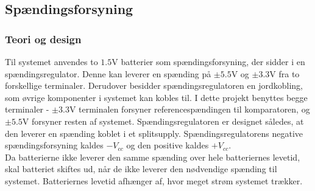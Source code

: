 \subsection{Spændingsforsyning}
\subsubsection{Teori og design}
Til systemet anvendes to $1.5$V batterier som spændingsforsyning, der sidder i en spændingsregulator. Denne kan leverer en spænding på $\pm5.5$V og $\pm3.3$V fra to forskellige terminaler. Derudover besidder spændingsregulatoren en jordkobling, som øvrige komponenter i systemet kan kobles til. I dette projekt benyttes begge terminaler - $\pm3.3$V terminalen forsyner referencespændingen til komparatoren, og $\pm5.5$V forsyner resten af systemet. Spændingsregulatoren er designet således, at den leverer en spænding koblet i et splitsupply. Spændingsregulatorens negative spændingsforsyning kaldes $-V_{cc}$ og den positive kaldes $+V_{cc}$. \\%
Da batterierne ikke leverer den samme spænding over hele batteriernes levetid, skal batteriet skiftes ud, når de ikke leverer den nødvendige spænding til systemet. Batteriernes levetid afhænger af, hvor meget strøm systemet trækker. %

